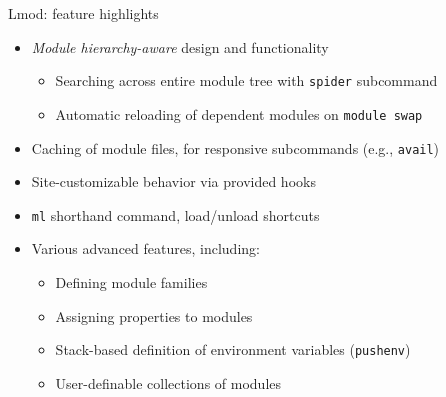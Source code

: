 \documentclass[10pt,xcolor={usenames,dvipsnames}]{beamer}
\begin{document}
\begin{frame}{Lmod: feature highlights}
\begin{itemize}
    \item
        \emph{Module hierarchy-aware} design and functionality
    \begin{itemize}
        \item
            Searching across entire module tree with \texttt{spider} subcommand
        \item
            Automatic reloading of dependent modules on \texttt{module swap}
    \end{itemize}
    \item
        Caching of module files, for responsive subcommands
        (e.g., \texttt{avail})
    \item
        Site-customizable behavior via provided hooks
    \item
        \texttt{ml} shorthand command, load/unload shortcuts
    \item
        Various advanced features, including:
    \begin{itemize}
        \item
            Defining module families
        \item
            Assigning properties to modules
        \item
            Stack-based definition of environment variables (\texttt{pushenv})
        \item
            User-definable collections of modules
    \end{itemize}
\end{itemize}
\end{frame}

\end{document}
